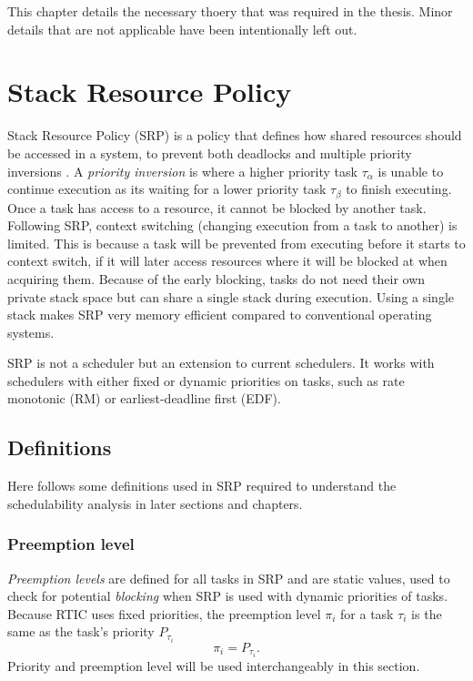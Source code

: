 This chapter details the necessary thoery that was required in the thesis.
Minor details that are not applicable have been intentionally left out.

\section{Stack Resource Policy}
\label{theory:srp}
Stack Resource Policy (SRP) is a policy that defines how shared resources
should be accessed in a system, to prevent both deadlocks and multiple priority
inversions \cite{srp}. A \emph{priority inversion} is where a higher priority
task $\tau_\alpha$ is unable to continue execution as its waiting for a lower
priority task $\tau_\beta$ to finish executing. Once a task has access to a
resource, it cannot be blocked by another task. Following SRP, context
switching (changing execution from a task to another) is limited. This is
because a task will be prevented from executing before it starts to context
switch, if it will later access resources where it will be blocked at when
acquiring them. Because of the early blocking, tasks do not need their own
private stack space but can share a single stack during execution. Using a
single stack makes SRP very memory efficient compared to conventional operating
systems\cite{hardrealtimecomputingsystems}.

SRP is not a scheduler but an extension to current schedulers. It works with
schedulers with either fixed or dynamic priorities on tasks, such as rate
monotonic (RM) or earliest-deadline first (EDF).

\subsection{Definitions}
\label{theory:srp:definitions}
Here follows some definitions used in SRP required to understand the
schedulability analysis in later sections and chapters.

\subsubsection{Preemption level}
\label{theory:srp:definitions:preemption}
\emph{Preemption levels} are defined for all tasks in SRP and are static
values, used to check for potential \emph{blocking} when SRP is used with
dynamic priorities of tasks. Because RTIC uses fixed priorities, the
preemption level $\pi_i$ for a task $\tau_i$ is the same as the task's priority
$P_{\tau_i}$
\begin{equation}
    \pi_i = P_{\tau_i}.
\end{equation}
Priority and preemption level will be used interchangeably in this section.

